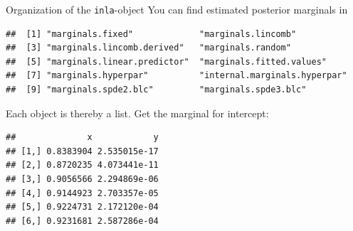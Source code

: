 \documentclass[
  ignorenonframetext,
]{beamer}
\newenvironment{Shaded}{\begin{snugshade}}{\end{snugshade}}
\newcommand{\DecValTok}[1]{\textcolor[rgb]{0.00,0.00,0.81}{#1}}
\newcommand{\FunctionTok}[1]{\textcolor[rgb]{0.00,0.00,0.00}{#1}}
\newcommand{\NormalTok}[1]{#1}
\newcommand{\SpecialCharTok}[1]{\textcolor[rgb]{0.00,0.00,0.00}{#1}}
\begin{document}
\begin{frame}[fragile]{Organization of the \texttt{inla}-object}
\protect\hypertarget{organization-of-the-inla-object-2}{}
You can find estimated posterior marginals in \small

\begin{verbatim}
##  [1] "marginals.fixed"             "marginals.lincomb"          
##  [3] "marginals.lincomb.derived"   "marginals.random"           
##  [5] "marginals.linear.predictor"  "marginals.fitted.values"    
##  [7] "marginals.hyperpar"          "internal.marginals.hyperpar"
##  [9] "marginals.spde2.blc"         "marginals.spde3.blc"
\end{verbatim}

\normalsize

Each object is thereby a list. Get the marginal for intercept:

\scriptsize

\begin{Shaded}
\end{Shaded}

\begin{verbatim}
##              x            y
## [1,] 0.8383904 2.535015e-17
## [2,] 0.8720235 4.073441e-11
## [3,] 0.9056566 2.294869e-06
## [4,] 0.9144923 2.703357e-05
## [5,] 0.9224731 2.172120e-04
## [6,] 0.9231681 2.587286e-04
\end{verbatim}

\normalsize
\end{frame}
\end{document}

